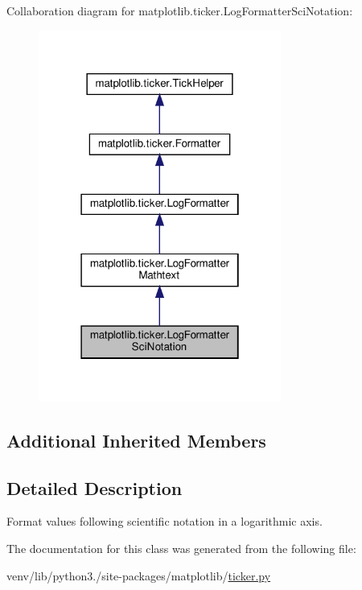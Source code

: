 Collaboration diagram for matplotlib.\+ticker.\+Log\+Formatter\+Sci\+Notation\+:
\nopagebreak
\begin{figure}[H]
\begin{center}
\leavevmode
\includegraphics[width=226pt]{classmatplotlib_1_1ticker_1_1LogFormatterSciNotation__coll__graph}
\end{center}
\end{figure}
\subsection*{Additional Inherited Members}


\subsection{Detailed Description}
\begin{DoxyVerb}Format values following scientific notation in a logarithmic axis.
\end{DoxyVerb}
 

The documentation for this class was generated from the following file\+:\begin{DoxyCompactItemize}
\item 
venv/lib/python3./site-\/packages/matplotlib/\hyperlink{ticker_8py}{ticker.\+py}\end{DoxyCompactItemize}
